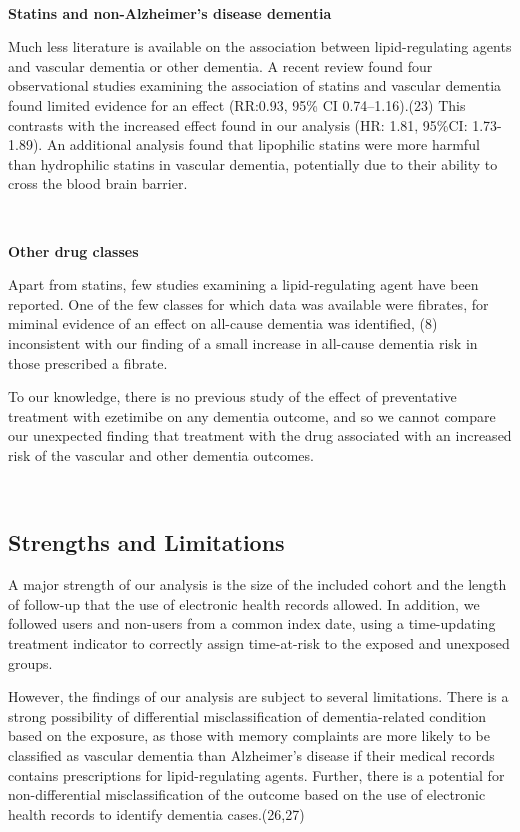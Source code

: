 \documentclass[
]{article}
\begin{document}
~

\textbf{Statins and non-Alzheimer's disease dementia}

Much less literature is available on the association between lipid-regulating agents and vascular dementia or other dementia. A recent review found four observational studies examining the association of statins and vascular dementia found limited evidence for an effect (RR:0.93, 95\% CI 0.74--1.16).(23) This contrasts with the increased effect found in our analysis (HR: 1.81, 95\%CI: 1.73-1.89). An additional analysis found that lipophilic statins were more harmful than hydrophilic statins in vascular dementia, potentially due to their ability to cross the blood brain barrier.

~

\textbf{Other drug classes}

Apart from statins, few studies examining a lipid-regulating agent have been reported. One of the few classes for which data was available were fibrates, for miminal evidence of an effect on all-cause dementia was identified, (8) inconsistent with our finding of a small increase in all-cause dementia risk in those prescribed a fibrate.

To our knowledge, there is no previous study of the effect of preventative treatment with ezetimibe on any dementia outcome, and so we cannot compare our unexpected finding that treatment with the drug associated with an increased risk of the vascular and other dementia outcomes.

~

\hypertarget{strengths-and-limitations}{%
\subsection{Strengths and Limitations}\label{strengths-and-limitations}}

A major strength of our analysis is the size of the included cohort and the length of follow-up that the use of electronic health records allowed. In addition, we followed users and non-users from a common index date, using a time-updating treatment indicator to correctly assign time-at-risk to the exposed and unexposed groups.

However, the findings of our analysis are subject to several limitations. There is a strong possibility of differential misclassification of dementia-related condition based on the exposure, as those with memory complaints are more likely to be classified as vascular dementia than Alzheimer's disease if their medical records contains prescriptions for lipid-regulating agents. Further, there is a potential for non-differential misclassification of the outcome based on the use of electronic health records to identify dementia cases.(26,27)
\end{document}
